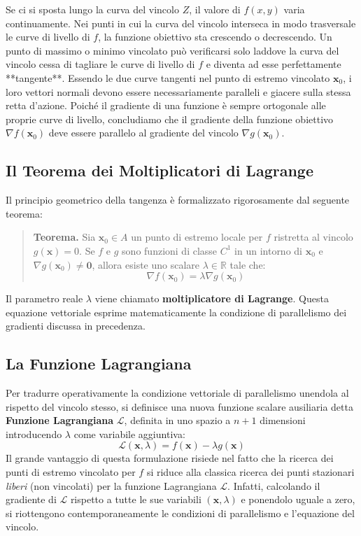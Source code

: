 Se ci si sposta lungo la curva del vincolo $Z$, il valore di $f(x,y)$ varia continuamente. Nei punti in cui la curva del vincolo interseca in modo trasversale le curve di livello di $f$, la funzione obiettivo sta crescendo o decrescendo. Un punto di massimo o minimo vincolato può verificarsi solo laddove la curva del vincolo cessa di tagliare le curve di livello di $f$ e diventa ad esse perfettamente **tangente**. 
Essendo le due curve tangenti nel punto di estremo vincolato $\mathbf{x}_0$, i loro vettori normali devono essere necessariamente paralleli e giacere sulla stessa retta d'azione. Poiché il gradiente di una funzione è sempre ortogonale alle proprie curve di livello, concludiamo che il gradiente della funzione obiettivo $\nabla f(\mathbf{x}_0)$ deve essere parallelo al gradiente del vincolo $\nabla g(\mathbf{x}_0)$.

\subsection{Il Teorema dei Moltiplicatori di Lagrange}
Il principio geometrico della tangenza è formalizzato rigorosamente dal seguente teorema:

\begin{quote}
\textbf{Teorema.} Sia $\mathbf{x}_0 \in A$ un punto di estremo locale per $f$ ristretta al vincolo $g(\mathbf{x}) = 0$. Se $f$ e $g$ sono funzioni di classe $C^1$ in un intorno di $\mathbf{x}_0$ e $\nabla g(\mathbf{x}_0) \neq \mathbf{0}$, allora esiste uno scalare $\lambda \in \mathbb{R}$ tale che:
\[ \nabla f(\mathbf{x}_0) = \lambda \nabla g(\mathbf{x}_0) \]
\end{quote}
Il parametro reale $\lambda$ viene chiamato \textbf{moltiplicatore di Lagrange}. Questa equazione vettoriale esprime matematicamente la condizione di parallelismo dei gradienti discussa in precedenza.

\subsection{La Funzione Lagrangiana}
Per tradurre operativamente la condizione vettoriale di parallelismo unendola al rispetto del vincolo stesso, si definisce una nuova funzione scalare ausiliaria detta \textbf{Funzione Lagrangiana} $\mathcal{L}$, definita in uno spazio a $n+1$ dimensioni introducendo $\lambda$ come variabile aggiuntiva:
\[ \mathcal{L}(\mathbf{x}, \lambda) = f(\mathbf{x}) - \lambda g(\mathbf{x}) \]
Il grande vantaggio di questa formulazione risiede nel fatto che la ricerca dei punti di estremo vincolato per $f$ si riduce alla classica ricerca dei punti stazionari \textit{liberi} (non vincolati) per la funzione Lagrangiana $\mathcal{L}$. Infatti, calcolando il gradiente di $\mathcal{L}$ rispetto a tutte le sue variabili $(\mathbf{x}, \lambda)$ e ponendolo uguale a zero, si riottengono contemporaneamente le condizioni di parallelismo e l'equazione del vincolo.

